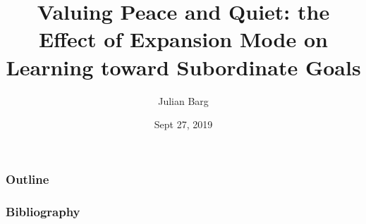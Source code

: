 \documentclass{beamer}
\title{Valuing Peace and Quiet: the Effect of Expansion Mode on Learning toward Subordinate Goals}
\author{Julian Barg}
\institute{Ivey Business School}
\date{Sept 27, 2019}
\begin{document}
	
\frame{\titlepage}

\begin{frame}
	\frametitle{Outline}
	\tableofcontents
\end{frame}





\begin{frame}[allowframebreaks]
	\frametitle{Bibliography}
	
	
\end{frame}
\end{document}
